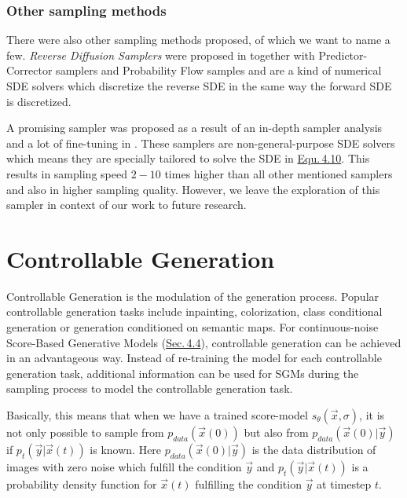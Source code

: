 \subsubsection{Other sampling methods}
%
There were also other sampling methods proposed, of which we want to name a few. \textit{Reverse Diffusion Samplers} were proposed in \cite{score_3} together with Predictor-Corrector samplers and Probability Flow samples and are a kind of numerical SDE solvers which discretize the reverse SDE in the same way the forward SDE is discretized.

A promising sampler was proposed as a result of an in-depth sampler analysis and a lot of fine-tuning in \cite{gotta_go_fast}. These samplers are non-general-purpose SDE solvers which means they are specially tailored to solve the SDE in \hyperref[equ:4.10]{Equ.\,4.10}. This results in sampling speed $2-10$ times higher than all other mentioned samplers and also in higher sampling quality. However, we leave the exploration of this sampler in context of our work to future research.

\section{Controllable Generation} \label{sec:4.5}
Controllable Generation is the modulation of the generation process. Popular controllable generation tasks include inpainting, colorization, class conditional generation or generation conditioned on semantic maps. For continuous-noise Score-Based Generative Models (\hyperref[sec:4.4]{Sec.\,4.4}), controllable generation can be achieved in an advantageous way. Instead of re-training the model for each controllable generation task, additional information can be used for SGMs during the sampling process to model the controllable generation task.

Basically, this means that when we have a trained score-model $s_\theta(\vec{x}, \sigma)$, it is not only possible to sample from $p_{data}(\vec{x}(0))$ but also from $p_{data}(\vec{x}(0)|\vec{y})$ if $p_t(\vec{y}|\vec{x}(t))$ is known. Here $p_{data}(\vec{x}(0)|\vec{y})$ is the data distribution of images with zero noise which fulfill the condition $\vec{y}$ and $p_t(\vec{y}|\vec{x}(t))$ is a probability density function for $\vec{x}(t)$ fulfilling the condition $\vec{y}$ at timestep $t$.

